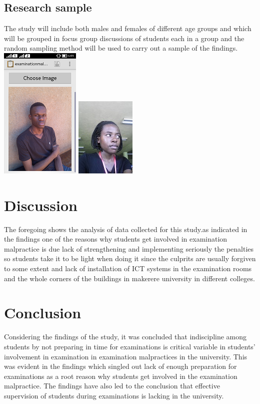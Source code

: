 \documentclass [8 pt]{article}
\begin{document}
\subsection {Research sample }
The study will include both males and females of different age groups and which will be grouped in focus group discussions of students each in a group and the random sampling method will be used to carry out a sample of the findings. 
\includegraphics{pic5}
\includegraphics{pic6}
\section {Discussion}
The foregoing shows the analysis of data collected for this study.as indicated in the findings one of the reasons why students get involved in examination malpractice is due lack of strengthening and implementing seriously the penalties so students take it to be light when doing it since the culprits are usually forgiven to some extent and lack of installation of ICT systems in the examination rooms and the whole corners of the buildings in makerere university in different colleges.

\section {Conclusion}
Considering the findings of the study, it was concluded that indiscipline among students by not preparing in time for examinations is critical variable in students’ involvement in examination in examination malpractices in the university. This was evident in the findings which singled out lack of enough preparation for examinations as a root reason why students get involved in the examination malpractice. The findings have also led to the conclusion that effective supervision of students during examinations is lacking in the university.
\end{document}
